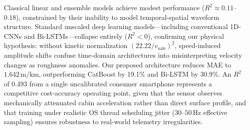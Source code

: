 \documentclass[conference]{IEEEtran}
\begin{document}
\begin{table}[t]
\centering
\caption{Comprehensive Performance Comparison Across 10 ML/DL Baselines}
\label{tab:baselines}
\end{table}

Classical linear and ensemble models achieve modest performance ($R^2 \approx 0.11$--$0.18$), constrained by their inability to model temporal-spatial waveform structure. Standard unscaled deep learning models—including conventional 1D-CNNs and Bi-LSTMs—collapse entirely ($R^2 < 0$), confirming our physical hypothesis: without kinetic normalization $(22.22/v_{\text{safe}})^2$, speed-induced amplitude shifts confuse time-domain architectures into misinterpreting velocity changes as roughness anomalies. Our proposed architecture reduces MAE to $1.642\,\text{m/km}$, outperforming CatBoost by 19.1\% and Bi-LSTM by 30.9\%. An $R^2$ of $0.493$ from a single uncalibrated consumer smartphone represents a competitive cost-accuracy operating point, given that the sensor observes mechanically attenuated cabin acceleration rather than direct surface profile, and that training under realistic OS thread scheduling jitter ($30$--$50\,\text{Hz}$ effective sampling) ensures robustness to real-world telemetry irregularities.
\end{document}
